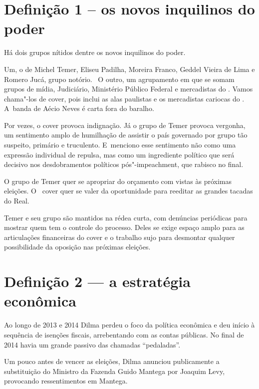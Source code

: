  

\section{Definição 1 -- os novos inquilinos do poder}

Há dois grupos nítidos dentre os novos inquilinos do poder.

Um, o  de Michel Temer, Eliseu Padilha, Moreira Franco, Geddel
Vieira de Lima e Romero Jucá, grupo notório. ~O outro, um agrupamento em
que se somam grupos de mídia, Judiciário, Ministério Público Federal e
mercadistas do . Vamos chama"-los de  cover, pois inclui as alas
paulistas e os mercadistas cariocas do . A~banda de Aécio Neves é
carta fora do baralho.

Por vezes, o  cover provoca indignação. Já o grupo de Temer provoca
vergonha, um sentimento amplo de humilhação de assistir o país governado
por grupo tão suspeito, primário e truculento. E~menciono esse
sentimento não como uma expressão individual de repulsa, mas como um
ingrediente político que será decisivo nos desdobramentos políticos
pós"-impeachment, que rabisco no final.

O grupo de Temer quer se apropriar do orçamento com vistas às próximas
eleições. O~ cover quer se valer da oportunidade para reeditar as
grandes tacadas do Real.

Temer e seu grupo são mantidos na rédea curta, com denúncias periódicas
para mostrar quem tem o controle do processo. Deles se exige espaço
amplo para as articulações financeiras do  cover e o trabalho sujo
para desmontar qualquer possibilidade da oposição nas próximas eleições.

\section{Definição 2 --- a estratégia econômica}

Ao longo de 2013 e 2014 Dilma perdeu o foco da política econômica e deu
início à sequência de isenções fiscais, arrebentando com as contas
públicas. No final de 2014 havia um grande passivo das chamadas
``pedaladas''.

Um pouco antes de vencer as eleições, Dilma anunciou publicamente a
substituição do Ministro da Fazenda Guido Mantega por Joaquim Levy,
provocando ressentimentos em Mantega.

